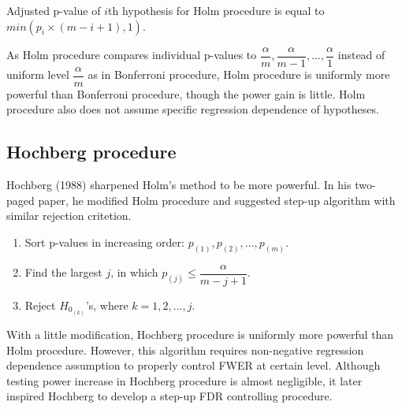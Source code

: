 \documentclass[a4paper, 11pt, oneside]{article}
\begin{document}
Adjusted p-value of $i$th hypothesis for Holm procedure is equal to $min(p_i \times (m-i+1), 1)$. \par
    As Holm procedure compares individual p-values to $\dfrac{\alpha}{m}, \dfrac{\alpha}{m-1}, ..., \dfrac{\alpha}{1}$ instead of uniform level $\dfrac{\alpha}{m}$ as in Bonferroni procedure, Holm procedure is uniformly more powerful than Bonferroni procedure, though the power gain is little. Holm procedure also does not assume specific regression dependence of hypotheses.


\subsection{Hochberg procedure}
Hochberg (1988) sharpened Holm's method to be more powerful. In his two-paged paper, he modified Holm procedure and suggested step-up algorithm with similar rejection critetion. 
\begin{enumerate}
  \item Sort p-values in increasing order: $p_{(1)}, p_{(2)}, ..., p_{(m)}$.
  \item Find the largest $j$, in which $p_{(j)} \leq \dfrac{\alpha}{m-j+1}$.
  \item Reject $H_{0_{(k)}}$'s, where $k=1, 2, ..., j$.
\end{enumerate}
    With a little modification, Hochberg procedure is uniformly more powerful than Holm procedure. However, this algorithm requires non-negative regression dependence assumption to properly control FWER at certain level. Although testing power increase in Hochberg procedure is almost negligible, it later inspired Hochberg to develop a step-up FDR controlling procedure.

\vspace{0.2in}
\end{document}
